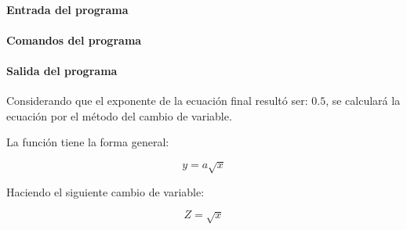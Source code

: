 \documentclass[letter,11pt]{article}
\begin{document}
\paragraph{Entrada del programa}
\begin{alltt}
\footnotesize

\normalsize
\end{alltt}

\paragraph{Comandos del programa}
\begin{alltt}
\footnotesize

\normalsize
\end{alltt}

\paragraph{Salida del programa}
\begin{alltt}
\footnotesize

\normalsize
\end{alltt}

Considerando que el exponente de la ecuación final resultó ser: $0.5$, se
calculará la ecuación por el método del cambio de variable.

La función tiene la forma general:

\begin{equation}
    y = a \sqrt{x}
\end{equation}

Haciendo el siguiente cambio de variable:

\begin{equation*}
    Z = \sqrt{x}
\end{equation*}
\end{document}
